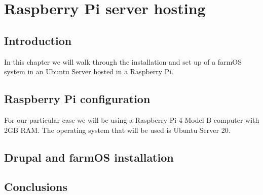 \chapter{Raspberry Pi server hosting}\label{cap:raspi}

\section{Introduction}
In this chapter we will walk through the installation and set up of a farmOS system in an Ubuntu Server hosted in a Raspberry Pi.


\section{Raspberry Pi configuration}
For our particular case we will be using a Raspberry Pi 4 Model B computer with 2GB RAM. The operating system that will be used is Ubuntu Server 20.
\section{Drupal and farmOS installation}

\section{Conclusions}


